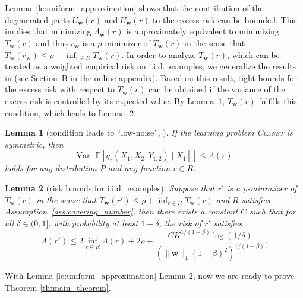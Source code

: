 \documentclass[letterpaper]{article} %
\newtheorem{lemma}{Lemma}
\newcommand{\E}{\mathbb{E}}
\newcommand{\Var}{\text{Var}}
\newcommand{\weight}{\mathbf{w}}
\newcommand{\distribution}{P}
\newcommand{\problemabbr}{\textnormal{C}\textsc{lanet}}
\newcommand{\normo}[1]{\|#1\|_1}
\newcommand{\complexbound}{\beta}
\newcommand{\red}[1]{\textcolor{red}{#1}}
\newcommand{\todo}[1]{\red{\textsc{todo:} #1}}
\begin{document}
Lemma~\ref{le:uniform_approximation} shows that the contribution of the degenerated parts $U_\weight{}(r)$ and $\widetilde{U}_\weight{}(r)$ to the excess risk can be bounded. 
This implies that minimizing $\Lambda_\weight{}(r)$ is approximately equivalent to minimizing $T_\weight{}(r)$ and thus $r_\weight{}$ is a $\rho$-minimizer of $T_\weight{}(r)$ in the sense that $T_\weight{}(r_\weight{})\le \rho+\inf_{r\in R}T_\weight{}(r)$.
In order to analyze $T_\weight{}(r)$, which can be treated as a weighted empirical risk on i.i.d.\ examples, we generalize the results in \cite{Massart2006} (see Section~B in the online appendix). 
Based on this result, tight bounds for the excess risk with respect to $T_\weight{}(r)$
can be obtained if the variance of the excess risk is controlled by its expected value.
By Lemma~\ref{le:variant_control}, $T_\weight{}(r)$ fulfills this condition, which leads to Lemma~\ref{le:risk_bounds_iid}.

\begin{lemma}[condition leads to ``low-noise'', {\cite[Lemma 2]{papa2016graph}}]
    \label{le:variant_control}
    If the learning problem \problemabbr{} is symmetric, then
    \begin{equation}
        \label{eq:variant_control}
        \Var\left[\E[q_r(X_1,X_2,Y_{1,2})\mid X_1]\right]\le \Lambda(r) 
    \end{equation}
    holds for any distribution $\distribution$ and any function $r\in R$.
\end{lemma}

\begin{lemma}[risk bounds for i.i.d.\ examples]
\label{le:risk_bounds_iid}
  Suppose that $r'$ is a $\rho$-minimizer of $T_\weight{}(r)$ in the sense that $T_\weight{}(r')\le \rho + \inf_{r\in R}T_\weight{}(r)$ and $R$ satisfies Assumption~\ref{ass:covering_number}, then there exists a constant $C$ such that for all $\delta\in(0,1]$, with probability at least $1-\delta$, the risk of $r'$ satisfies
  \[\Lambda(r')\le 2\inf_{r\in R}\Lambda(r)+2\rho+\frac{CK^{1/(1+\complexbound{})}\log(1/\delta)}{(\normo{\weight{}}(1-\complexbound{})^2)^{1/(1+\complexbound{})}}.\]
\end{lemma}


With Lemma \ref{le:uniform_approximation} Lemma \ref{le:risk_bounds_iid}, now we are ready to prove Theorem \ref{th:main_theorem}.
\end{document}

